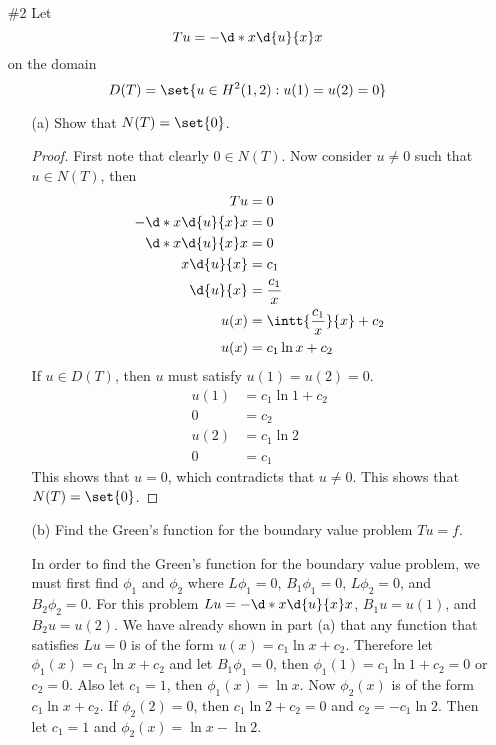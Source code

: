 \documentclass[11pt, oneside]{article}
\begin{document}
\begin{enumerate}
  \pagebreak
  \item[\#2] %
    Let
    \[
      Tu = - \d*{x \d{u}{x}}{x}
    \]
    on the domain
    \[
      D(T) = \set{u \in H^2(1, 2): u(1) = u(2) = 0}
    \]
    \begin{enumerate}
      \item[(a)] %
        Show that $N(T) = \set{0}$.

        \begin{proof}
          First note that clearly $0 \in N(T)$.
          Now consider $u \neq 0$ such that $u \in N(T)$, then
          \begin{align*}
            Tu &= 0 \\
            - \d*{x \d{u}{x}}{x} &= 0 \\
            \d*{x \d{u}{x}}{x} &= 0 \\
            x \d{u}{x} &= c_1 \\
            \d{u}{x} &= \frac{c_1}{x} \\
            u(x) &= \intt{\frac{c_1}{x}}{x} + c_2\\
            u(x) &= c_1 \ln{x} + c_2\\
          \end{align*}
          If $u \in D(T)$, then $u$ must satisfy $u(1) = u(2) = 0$.
          \begin{align*}
            u(1) &= c_1 \ln{1} + c_2 \\
            0 &= c_2 \\
            u(2) &= c_1 \ln{2} \\
            0 &= c_1
          \end{align*}
          This shows that $u = 0$, which contradicts that $u \neq 0$.
          This shows that $N(T) = \set{0}$.
        \end{proof}

      \item[(b)] %
        Find the Green's function for the boundary value problem $Tu = f$.

        In order to find the Green's function for the boundary value problem,
        we must first find $\phi_1$ and $\phi_2$ where $L\phi_1 = 0$,
        $B_1 \phi_1 = 0$, $L\phi_2 = 0$, and $B_2 \phi_2 = 0$.
        For this problem $Lu = - \d*{x \d{u}{x}}{x}$, $B_1 u = u(1)$, and $B_2 u = u(2)$.
        We have already shown in part (a) that any function that satisfies $Lu = 0$ is
        of the form $u(x) = c_1 \ln{x} + c_2$.
        Therefore let $\phi_1(x) = c_1 \ln{x} + c_2$ and let $B_1 \phi_1 = 0$,
        then $\phi_1(1) = c_1 \ln{1} + c_2 = 0$ or $c_2 = 0$.
        Also let $c_1 = 1$, then $\phi_1(x) = \ln{x}$.
        Now $\phi_2(x)$ is of the form $c_1 \ln{x} + c_2$.
        If $\phi_2(2) = 0$, then $c_1 \ln{2} + c_2 = 0$ and $c_2 = -c_1 \ln{2}$.
        Then let $c_1 = 1$ and $\phi_2(x) = \ln{x} - \ln{2}$.


\end{enumerate}
\end{enumerate}
\end{document}

